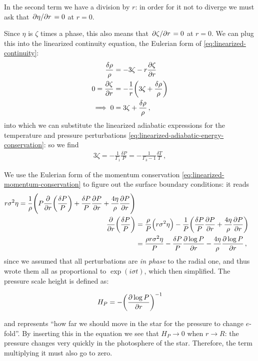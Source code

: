 \documentclass[main.tex]{subfiles}
\begin{document}
In the second term we have a division by \(r\): in order for it not to diverge we must ask that \(\pdv*{\eta }{r} =0\) at \(r=0\). 

Since \(\eta \) is \(\zeta \) times a phase, this also means that \(\pdv*{\zeta }{r} =0 \) at \(r=0\). 
We can plug this into the linearized continuity equation, the Eulerian form of \eqref{eq:linearized-continuity}: 
%
\begin{align}
\frac{ \delta \rho }{\rho } &= - 3\zeta - r\pdv{\zeta }{r} \\
0=\pdv{\zeta }{r} &= - \frac{1}{r} \qty(3\zeta + \frac{ \delta \rho }{\rho })  \\
\implies 0 &= 3\zeta + \frac{ \delta \rho }{\rho }
\,,
\end{align}
%
into which we can substitute the linearized adiabatic expressions for the temperature and pressure perturbations \eqref{eq:linearized-adiabatic-energy-conservation}: so we find 
%
\begin{align}
3\zeta = - \frac{1}{\Gamma_1 } \frac{ \delta P }{P}
= - \frac{1}{\Gamma_3 -1} \frac{ \delta T}{T}
\,,
\end{align}
%


We use the Eulerian form of the momentum conservation \eqref{eq:linearized-momentum-conservation} to figure out the surface boundary conditions: it reads 
%
\begin{align}
r \sigma^2 \eta = 
\frac{1}{\rho } \qty(P \pdv{}{r} \qty(\frac{ \delta P}{P}) 
+ \frac{ \delta P }{P } \pdv{P}{r} 
+ \frac{4 \eta }{\rho } \pdv{P}{r})  \\
\pdv{}{r} \qty(\frac{ \delta P}{P}) &= \frac{\rho}{P} 
\qty(r \sigma^2 \eta ) - \frac{1}{P} \qty(\frac{ \delta P}{P} \pdv{P}{r} + \frac{4 \eta }{\rho } \pdv{P}{r})  \\
&= \frac{\rho r \sigma^2 \eta }{P}
- \frac{ \delta P}{P} \pdv{\log P}{r}
- \frac{4 \eta }{\rho } \pdv{\log P}{r}
\,,
\end{align}
%
since we assumed that all perturbations are \emph{in phase} to the radial one, and thus wrote them all as proportional to \(\exp(i \sigma t)\), which then simplified.
The pressure scale height is defined as:

\begin{equation}
  H_P = - \qty(\pdv{\log P }{r} )^{-1}
\end{equation}

and represents ``how far we should move in the star for the pressure to change \(e\)-fold''.
By inserting this in the equation we see that \(H_P \rightarrow 0\) when \(r \rightarrow R\): the pressure changes very quickly in the photosphere of the star. Therefore, the term multiplying it must also go to zero.
\end{document}
